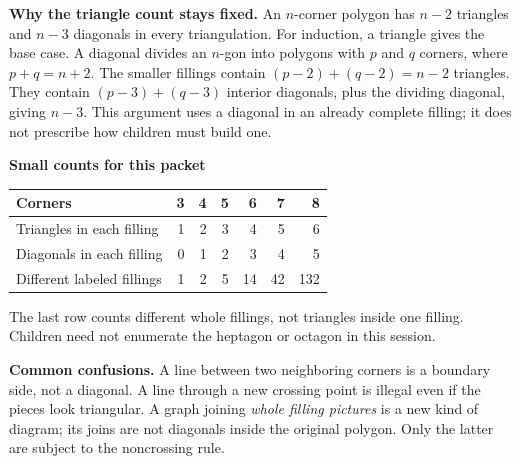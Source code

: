 \documentclass[11pt,letterpaper]{article}
\begin{document}
\textbf{Why the triangle count stays fixed.} An $n$-corner polygon has $n-2$ triangles and $n-3$ diagonals in every triangulation. For induction, a triangle gives the base case. A diagonal divides an $n$-gon into polygons with $p$ and $q$ corners, where $p+q=n+2$. The smaller fillings contain $(p-2)+(q-2)=n-2$ triangles. They contain $(p-3)+(q-3)$ interior diagonals, plus the dividing diagonal, giving $n-3$. This argument uses a diagonal in an already complete filling; it does not prescribe how children must build one.

\textbf{Small counts for this packet}
\begin{center}\begin{tabular}{lrrrrrr}\toprule
Corners&3&4&5&6&7&8\\\midrule
Triangles in each filling&1&2&3&4&5&6\\
Diagonals in each filling&0&1&2&3&4&5\\
Different labeled fillings&1&2&5&14&42&132\\\bottomrule\end{tabular}\end{center}
The last row counts different whole fillings, not triangles inside one filling. Children need not enumerate the heptagon or octagon in this session.

\textbf{Common confusions.} A line between two neighboring corners is a boundary side, not a diagonal. A line through a new crossing point is illegal even if the pieces look triangular. A graph joining \emph{whole filling pictures} is a new kind of diagram; its joins are not diagonals inside the original polygon. Only the latter are subject to the noncrossing rule.
\end{document}

